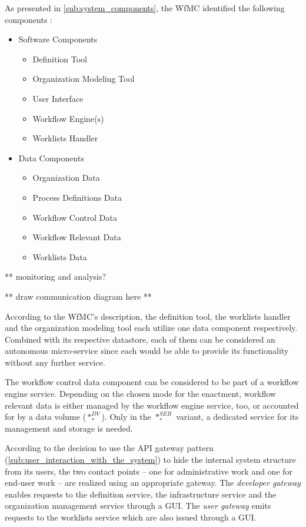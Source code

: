   As presented in \ref{sub:system_components}, the \ac{WfMC} identified the following components \cite[p.~13]{Hollingsworth1995WfMC}:
    \begin{itemize}[nosep]
      \item Software Components
        \begin{itemize}[nosep]
          \item Definition Tool %
          \item Organization Modeling Tool %
          \item User Interface
          \item Workflow Engine(s)
          \item Worklists Handler %
        \end{itemize}
      \item Data Components
        \begin{itemize}[nosep]
          \item Organization Data %
          \item Process Definitions Data %
          \item Workflow Control Data
          \item Workflow Relevant Data %
          \item Worklists Data %
        \end{itemize}
    \end{itemize}

    ** monitoring and analysis?

    ** draw communication diagram here **

  According to the \ac{WfMC}'s description, the definition tool, the worklists handler and the organization modeling tool each utilize one data component respectively. Combined with its respective datastore, each of them can be considered an autonomous micro-service since each would be able to provide its functionality without any further service.

  The workflow control data component can be considered to be part of a workflow engine service.
  Depending on the chosen mode for the enactment, workflow relevant data is either managed by the workflow engine service, too, or accounted for by a data volume ($*_{*}^{DV}$). Only in the $*_{*}^{SER}$ variant, a dedicated service for its management and storage is needed.

  According to the decision to use the \ac{API} gateway pattern (\ref{sub:user_interaction_with_the_system}) to hide the internal system structure from its users, the two contact points -- one for administrative work and one for end-user work -- are realized using an appropriate gateway. The \emph{developer gateway} enables requests to the definition service, the infrastructure service and the organization management service through a \ac{GUI}. The \emph{user gateway} emits requests to the worklists service which are also issued through a \ac{GUI}.

